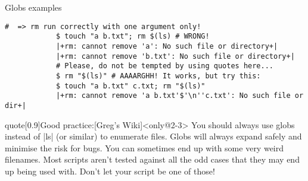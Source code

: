 \begin{frame}[fragile]{Globs examples}
\begin{onlyenv}
\begin{lstlisting}[style=MyBash, style=oddnumbers, xleftmargin=3mm, xrightmargin=3mm, firstnumber=32]
                       #  => rm run correctly with one argument only!
            $ touch "a b.txt"; rm $(ls) # WRONG!
            |+rm: cannot remove 'a': No such file or directory+|
            |+rm: cannot remove 'b.txt': No such file or directory+|
            # Please, do not be tempted by using quotes here...
            $ rm "$(ls)" # AAAARGHH! It works, but try this:
            $ touch "a b.txt" c.txt; rm "$(ls)"
            |+rm: cannot remove 'a b.txt'$'\n''c.txt': No such file or dir+|
        \end{lstlisting}
    \end{onlyenv}
    \vspace{2mm}
    \begin{varblock}{quote}[0.9\textwidth]{Good practice:}[Greg's Wiki]<only@2-3>
        You should always use globs instead of \textnormal{\bash|ls|} (or similar) to enumerate files.
        Globs will always expand safely and minimise the risk for bugs.
        You can sometimes end up with some very weird filenames.
        Most scripts aren't tested against all the odd cases that they may end up being used with.
        Don't let your script be one of those!\\[-0.7em] ~
    \end{varblock}
\end{frame}
